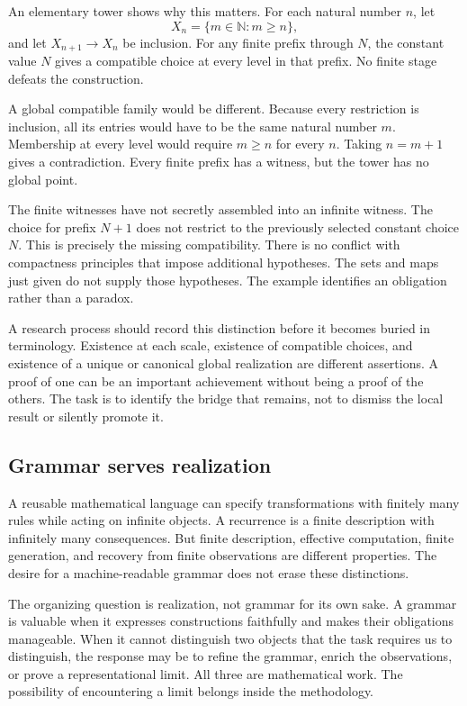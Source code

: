 An elementary tower shows why this matters. For each natural number \(n\), let
\[
X_n=\{m\in\mathbb N:m\geq n\},
\]
and let \(X_{n+1}\to X_n\) be inclusion. For any finite prefix through \(N\), the constant value \(N\) gives a compatible choice at every level in that prefix. No finite stage defeats the construction.

A global compatible family would be different. Because every restriction is inclusion, all its entries would have to be the same natural number \(m\). Membership at every level would require \(m\geq n\) for every \(n\). Taking \(n=m+1\) gives a contradiction. Every finite prefix has a witness, but the tower has no global point.

The finite witnesses have not secretly assembled into an infinite witness. The choice for prefix \(N+1\) does not restrict to the previously selected constant choice \(N\). This is precisely the missing compatibility. There is no conflict with compactness principles that impose additional hypotheses. The sets and maps just given do not supply those hypotheses. The example identifies an obligation rather than a paradox.

A research process should record this distinction before it becomes buried in terminology. Existence at each scale, existence of compatible choices, and existence of a unique or canonical global realization are different assertions. A proof of one can be an important achievement without being a proof of the others. The task is to identify the bridge that remains, not to dismiss the local result or silently promote it.

\subsection{Grammar serves realization}

A reusable mathematical language can specify transformations with finitely many rules while acting on infinite objects. A recurrence is a finite description with infinitely many consequences. But finite description, effective computation, finite generation, and recovery from finite observations are different properties. The desire for a machine-readable grammar does not erase these distinctions.

The organizing question is realization, not grammar for its own sake. A grammar is valuable when it expresses constructions faithfully and makes their obligations manageable. When it cannot distinguish two objects that the task requires us to distinguish, the response may be to refine the grammar, enrich the observations, or prove a representational limit. All three are mathematical work. The possibility of encountering a limit belongs inside the methodology.

